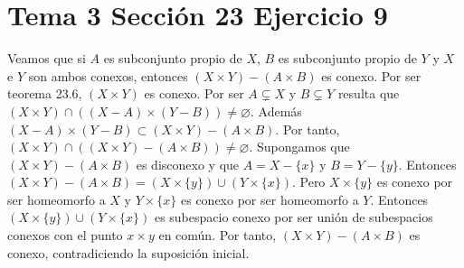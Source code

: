 \documentclass{article}
\begin{document}
\section{Tema 3 Sección 23 Ejercicio 9}
Veamos que si $A$ es subconjunto propio de $X$, $B$ es subconjunto propio de $Y$ y $X$ e $Y$ son ambos conexos, entonces $(X\times Y)-(A\times B)$ es conexo. Por ser teorema 23.6, $(X\times Y)$ es conexo. Por ser $A\subsetneq X$ y $B\subsetneq Y$ resulta que $(X\times Y)\cap ((X-A)\times (Y-B))\neq \varnothing$. Además $(X-A)\times (Y-B)\subset (X\times Y)-(A\times B)$. Por tanto, $(X\times Y)\cap ((X\times Y)-(A\times B))\neq \varnothing$. Supongamos que $(X\times Y)-(A\times B)$ es disconexo y que $A=X-\{x\}$ y $B=Y-\{y\}$. Entonces $(X\times Y)-(A\times B)=(X\times \{y\})\cup (Y\times \{x\})$. Pero $X\times \{y\}$ es conexo por ser homeomorfo a $X$ y   $Y\times \{x\}$ es conexo por ser homeomorfo a $Y$. Entonces $(X\times \{y\})\cup (Y\times \{x\})$ es subespacio conexo por ser unión de subespacios conexos con el punto $x\times y$ en común. Por tanto, $(X\times Y)-(A\times B)$ es conexo, contradiciendo la suposición inicial.
\end{document}
